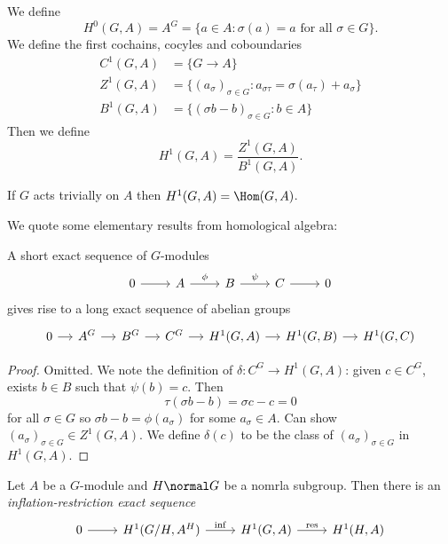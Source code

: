 \documentclass[a4paper]{article}
\theoremstyle{definition}
\theoremstyle{theorem}
\begin{document}
\begin{definition}
  We define
  \[
    H^0(G, A) = A^G = \{a \in A: \sigma(a) = a \text{ for all } \sigma \in G\}.
  \]
  We define the first cochains, cocyles and coboundaries 
  \begin{align*}
    C^1(G, A) &= \{G \to A\} \\
    Z^1(G, A) &= \{(a_\sigma)_{\sigma \in G}: a_{\sigma\tau} = \sigma(a_\tau) + a_\sigma\} \\
    B^1(G, A) &= \{(\sigma b - b)_{\sigma \in G}: b \in A\}
  \end{align*}
  Then we define
  \[
    H^1(G, A) = \frac{Z^1(G, A)}{B^1(G, A)}.
  \]
\end{definition}

\begin{remark}
  If \(G\) acts trivially on \(A\) then \(H^1(G, A) = \Hom(G, A)\).
\end{remark}

We quote some elementary results from homological algebra:

\begin{theorem}
  A short exact sequence of \(G\)-modules
  \[
    \begin{tikzcd}
      0 \ar[r] & A \ar[r, "\phi"] & B \ar[r, "\psi"] & C \ar[r] & 0
    \end{tikzcd}
  \]
  gives rise to a long exact sequence of abelian groups
  \[
    \begin{tikzcd}[column sep=small]
      0 \ar[r] & A^G \ar[r] & B^G \ar[r] & C^G \ar[r] & H^1(G, A) \ar[r] & H^1(G, B) \ar[r] & H^1(G, C)
    \end{tikzcd}
  \]
\end{theorem}

\begin{proof}
  Omitted. We note the definition of \(\delta: C^G \to H^1(G, A)\): given \(c \in C^G\), exists \(b \in B\) such that \(\psi(b) = c\). Then
  \[
    \tau(\sigma b - b) = \sigma c - c = 0
  \]
  for all \(\sigma \in G\) so \(\sigma b - b = \phi(a_\sigma)\) for some \(a_\sigma \in A\). Can show \((a_\sigma)_{\sigma \in G} \in Z^1(G, A)\). We define \(\delta(c)\) to be the class of \((a_\sigma)_{\sigma \in G}\) in \(H^1(G, A)\).
\end{proof}

\begin{theorem}
  Let \(A\) be a \(G\)-module and \(H \normal G\) be a nomrla subgroup. Then there is an \emph{inflation-restriction exact sequence}
  \[
    \begin{tikzcd}
      0 \ar[r] & H^1(G/H, A^H) \ar[r, "\mathrm{inf}"] & H^1(G, A) \ar[r, "\mathrm{res}"] & H^1(H, A)
    \end{tikzcd}
  \]
\end{theorem}
\end{document}
